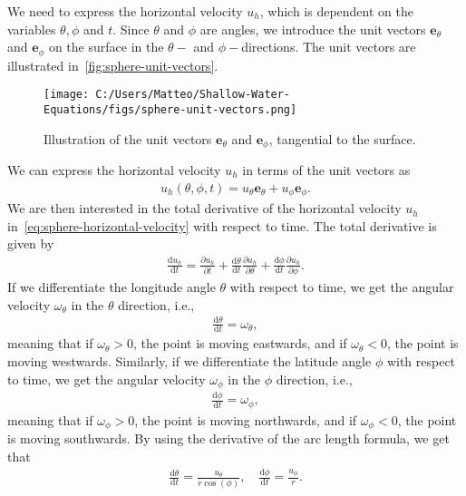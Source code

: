 We need to express the horizontal velocity $u_h$, which is dependent on the variables $\theta, \phi$ and $t$.
Since $\theta$ and $\phi$ are angles, we introduce the unit vectors $\mathbf{e}_\theta$ and $\mathbf{e}_\phi$ on the surface in the $\theta-$ and $\phi-$directions.
The unit vectors are illustrated in~\autoref{fig:sphere-unit-vectors}.
\begin{figure}[H]
    \centering
    \texttt{[image: C:/Users/Matteo/Shallow-Water-Equations/figs/sphere-unit-vectors.png]}
    \caption{Illustration of the unit vectors $\mathbf{e}_\theta$ and $\mathbf{e}_\phi$, tangential to the surface.}\label{fig:sphere-unit-vectors}
\end{figure}
We can express the horizontal velocity $u_h$ in terms of the unit vectors as
\begin{align}\label{eq:sphere-horizontal-velocity}
    u_h(\theta, \phi, t) = u_\theta \mathbf{e}_\theta + u_\phi \mathbf{e}_\phi.
\end{align}
We are then interested in the total derivative of the horizontal velocity $u_h$ in~\eqref{eq:sphere-horizontal-velocity} with respect to time.
The total derivative is given by
\begin{align}\label{eq:sphere-total-derivative}
    \frac{\text{d}u_h}{\text{d}t} = \frac{\partial u_h}{\partial t} + \frac{\text{d}\theta}{\text{d}t} \frac{\partial u_h}{\partial \theta} + \frac{\text{d}\phi}{\text{d}t} \frac{\partial u_h}{\partial \phi}.
\end{align}
If we differentiate the longitude angle $\theta$ with respect to time, we get the angular velocity $\omega_\theta$ in the $\theta$ direction, i.e.,
\begin{align*}
    \frac{\text{d}\theta}{\text{d}t} = \omega_\theta,
\end{align*}
meaning that if $\omega_\theta > 0$, the point is moving eastwards, and if $\omega_\theta < 0$, the point is moving westwards.
Similarly, if we differentiate the latitude angle $\phi$ with respect to time, we get the angular velocity $\omega_\phi$ in the $\phi$ direction, i.e.,
\begin{align*}
    \frac{\text{d}\phi}{\text{d}t} = \omega_\phi,
\end{align*}
meaning that if $\omega_\phi > 0$, the point is moving northwards, and if $\omega_\phi < 0$, the point is moving southwards.
By using the  derivative of the arc length formula, we get that 
\begin{align}\label{eq:sphere-arc-length}
    \frac{\text{d}\theta}{\text{d}t} =  \frac{u_\theta}{r \cos(\phi)},
    \quad \frac{\text{d}\phi}{\text{d}t} = \frac{u_\phi}{r}.
\end{align}
